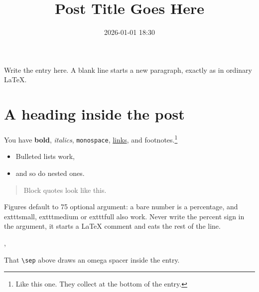 %
%
%

\title{Post Title Goes Here}
\date{2026-01-01 18:30}          %



Write the entry here. A blank line starts a new paragraph, exactly as in
ordinary LaTeX.

\section{A heading inside the post}

You have \textbf{bold}, \textit{italics}, \texttt{monospace},
\href{https://example.com}{links}, and footnotes.\footnote{Like this one. They
collect at the bottom of the entry.}

\begin{itemize}
  \item Bulleted lists work,
  \item and so do nested ones.
\end{itemize}

\begin{quote}
Block quotes look like this.
\end{quote}


Figures default to 75%
optional argument: a bare number is a percentage, and 	exttt{small},
	exttt{medium} or 	exttt{full} also work. Never write the percent sign in
the argument, it starts a LaTeX comment and eats the rest of the line.


\sep

That \verb|\sep| above draws an omega spacer inside the entry.


